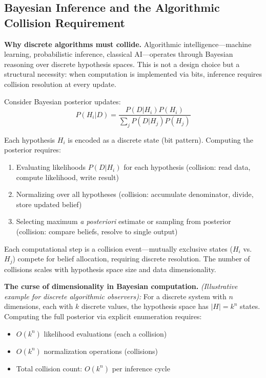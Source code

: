 \documentclass[12pt]{article}
\begin{document}
\subsection{Bayesian Inference and the Algorithmic Collision Requirement}
\label{sec:bayesian}

\textbf{Why discrete algorithms must collide.} Algorithmic intelligence---machine learning, probabilistic inference, classical AI---operates through Bayesian reasoning over discrete hypothesis spaces. This is not a design choice but a structural necessity: when computation is implemented via bits, inference requires collision resolution at every update.

Consider Bayesian posterior updates:
\begin{equation}
P(H_i | D) = \frac{P(D | H_i) P(H_i)}{\sum_j P(D | H_j) P(H_j)}
\end{equation}

Each hypothesis $H_i$ is encoded as a discrete state (bit pattern). Computing the posterior requires:
\begin{enumerate}
\item Evaluating likelihoods $P(D | H_i)$ for each hypothesis (collision: read data, compute likelihood, write result)
\item Normalizing over all hypotheses (collision: accumulate denominator, divide, store updated belief)
\item Selecting maximum \textit{a posteriori} estimate or sampling from posterior (collision: compare beliefs, resolve to single output)
\end{enumerate}

Each computational step is a collision event---mutually exclusive states ($H_i$ vs. $H_j$) compete for belief allocation, requiring discrete resolution. The number of collisions scales with hypothesis space size and data dimensionality.

\textbf{The curse of dimensionality in Bayesian computation.} \textit{(Illustrative example for discrete algorithmic observers):} For a discrete system with $n$ dimensions, each with $k$ discrete values, the hypothesis space has $|H| = k^n$ states. Computing the full posterior via explicit enumeration requires:
\begin{itemize}
\item $O(k^n)$ likelihood evaluations (each a collision)
\item $O(k^n)$ normalization operations (collisions)
\item Total collision count: $O(k^n)$ per inference cycle
\end{itemize}
\end{document}
